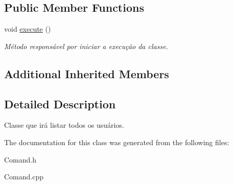 \subsection*{Public Member Functions}
\begin{DoxyCompactItemize}
\item 
\hypertarget{class_command_find_users_ab33e1107a64b988eaa31bf1e7611c990}{void \hyperlink{class_command_find_users_ab33e1107a64b988eaa31bf1e7611c990}{execute} ()}\label{class_command_find_users_ab33e1107a64b988eaa31bf1e7611c990}

\begin{DoxyCompactList}\small\item\em Método responsável por iniciar a execução da classe. \end{DoxyCompactList}\end{DoxyCompactItemize}
\subsection*{Additional Inherited Members}


\subsection{Detailed Description}
Classe que irá listar todos os usuários. 

The documentation for this class was generated from the following files\-:\begin{DoxyCompactItemize}
\item 
Comand.\-h\item 
Comand.\-cpp\end{DoxyCompactItemize}
